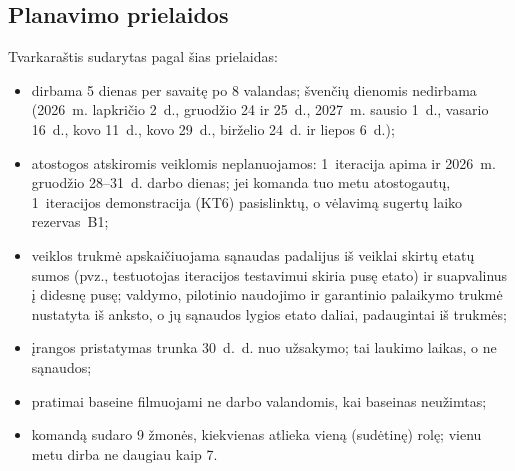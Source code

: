 \subsection{Planavimo prielaidos}

Tvarkaraštis sudarytas pagal šias prielaidas:
\begin{itemize}
  \item dirbama 5 dienas per savaitę po 8 valandas; švenčių dienomis
    nedirbama (2026~m. lapkričio 2~d., gruodžio 24 ir 25~d., 2027~m.
    sausio 1~d., vasario 16~d., kovo 11~d., kovo 29~d., birželio 24~d. ir
    liepos 6~d.);
  \item atostogos atskiromis veiklomis neplanuojamos: 1~iteracija apima ir
    2026~m. gruodžio 28--31~d. darbo dienas; jei komanda tuo metu
    atostogautų, 1~iteracijos demonstracija (KT6) pasislinktų, o vėlavimą
    sugertų laiko rezervas~B1;
  \item veiklos trukmė apskaičiuojama sąnaudas padalijus iš veiklai skirtų
    etatų sumos (pvz., testuotojas iteracijos testavimui skiria pusę etato)
    ir suapvalinus į didesnę pusę; valdymo, pilotinio naudojimo ir
    garantinio palaikymo trukmė nustatyta iš anksto, o jų sąnaudos lygios
    etato daliai, padaugintai iš trukmės;
  \item įrangos pristatymas trunka 30~d.~d. nuo užsakymo; tai laukimo laikas,
    o ne sąnaudos;
  \item pratimai baseine filmuojami ne darbo valandomis, kai baseinas
    neužimtas;
  \item komandą sudaro 9 žmonės, kiekvienas atlieka vieną (sudėtinę) rolę;
    vienu metu dirba ne daugiau kaip 7.
\end{itemize}

